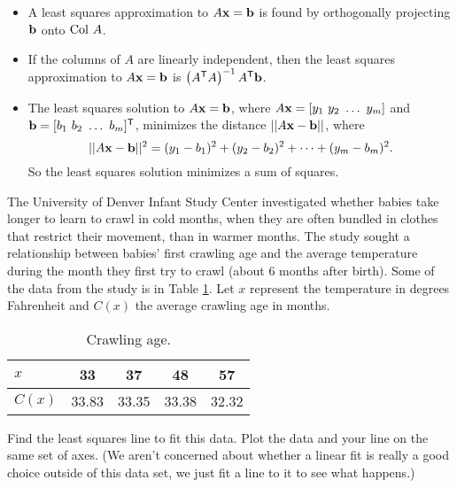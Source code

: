 \begin{itemize}
\item A least squares approximation to $A \mathbf{x} = \mathbf{b}$ is found by orthogonally projecting $\mathbf{b}$ onto $\text{Col } A$. 
\item If the columns of $A$ are linearly independent, then the least squares approximation to $A \mathbf{x} = \mathbf{b}$ is $\left(A^{\mathsf{T}}A\right)^{-1}A^{\mathsf{T}} \mathbf{b}$. 
\item The least squares solution to $A \mathbf{x} = \mathbf{b}$, where $A\mathbf{x} = [y_1 \ y_2 \ \ldots \ y_m]$ and $\mathbf{b} = [b_1 \ b_2 \ \ldots \ b_ m]^{\mathsf{T}}$, minimizes the distance $||A\mathbf{x} - \mathbf{b}||$, where 
\begin{equation*}
||A\mathbf{x} - \mathbf{b}||^2 = (y_1-b_1)^2 + (y_2-b_2)^2 + \cdots + (y_m-b_m)^2. 
\end{equation*}
So the least squares solution minimizes a sum of squares. 
 
\end{itemize}



\be
\item The University of Denver Infant Study Center investigated whether babies take longer to learn to crawl in cold months, when they are often bundled in clothes that restrict their movement, than in warmer months. The study sought a relationship between babies' first crawling age and the average temperature during the month they first try to crawl (about 6 months after birth). Some of the data from the study is in Table \ref{T:7_d_infants}. Let $x$ represent the temperature in degrees Fahrenheit and $C(x)$ the average crawling age in months. 

\begin{table}[ht]
\begin{center}
\begin{tabular}{|l||c|c|c|c|} \hline
$x$		&33		&37		&48		&57 \\ \hline
$C(x)$	&33.83	&33.35	&33.38	&32.32 \\ \hline
\end{tabular}
\end{center}
\caption{Crawling age.}
\label{T:7_d_infants}
\end{table}
	\ba
	\item Find the least squares line to fit this data. Plot the data and your line on the same set of axes. (We aren't concerned about whether a linear fit is really a good choice outside of this data set, we just fit a line to it to see what happens.)
	
